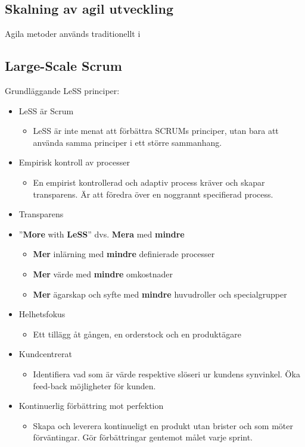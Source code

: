 	\subsection{Skalning av agil utveckling}
	Agila metoder används traditionellt i 
	
	
	\subsection{Large-Scale Scrum}
	
	
	Grundläggande LeSS principer: \cite{less_principles}
	
	\begin{itemize}
		\itemsep0em
		\item LeSS är Scrum
			\begin{itemize}
				\item LeSS är inte menat att förbättra SCRUMs principer, utan bara att använda samma principer i ett större sammanhang.
			\end{itemize}
		\item Empirisk kontroll av processer
			\begin{itemize}
				\item En empirist kontrollerad och adaptiv process kräver och skapar transparens. Är att föredra över en noggrannt specifierad process.
			\end{itemize}
		\item Transparens
		\item ''\textbf{More} with \textbf{LeSS}'' dvs. \textbf{Mera} med \textbf{mindre}
			\begin{itemize}
				\item \textbf{Mer} inlärning med \textbf{mindre} definierade processer
				\item \textbf{Mer} värde med \textbf{mindre} omkostnader
				\item \textbf{Mer} ägarskap och syfte med \textbf{mindre} huvudroller och specialgrupper
			\end{itemize}
		\item Helhetsfokus
			\begin{itemize}
				\item Ett tillägg åt gången, en orderstock och en produktägare
			\end{itemize}
		\item Kundcentrerat
			\begin{itemize}
				\item Identifiera vad som är värde respektive slöseri ur kundens synvinkel. Öka feed-back möjligheter för kunden.
			\end{itemize}
		\item Kontinuerlig förbättring mot perfektion
			\begin{itemize}
				\item Skapa och leverera kontinueligt en produkt utan brister och som möter förväntingar. Gör förbättringar gentemot målet varje sprint.
			\end{itemize}
	\end{itemize}
	
